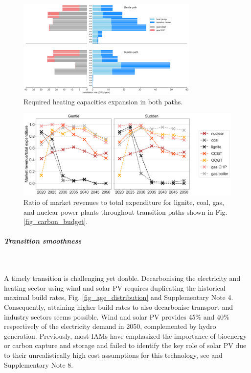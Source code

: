 \documentclass[5p]{elsarticle} %
\begin{document}
\begin{figure}[!h]
\centering
\includegraphics[width=0.8\textwidth]{figures/heating_expansion_Base.png}
\caption{Required heating capacities expansion in both paths.} \label{fig_heating_expansion} 
\end{figure}

\begin{figure}[!h]
\centering
\includegraphics[width=\columnwidth]{figures/revenue_vs_expenditure_Base.png}
\caption{Ratio of market revenues to total expenditure for lignite, coal, gas, and nuclear power plants throughout transition paths shown in Fig. \ref{fig_carbon_budget}. } \label{fig_revenue_vs_expenditure} 
\end{figure}

\subparagraph{\textbf{Transition smoothness}} \

A timely transition is challenging yet doable. Decarbonising the electricity and heating sector using wind and solar PV requires duplicating the historical \textcolor[rgb]{1,0,0}{maximal} build rates, Fig. \ref{fig_age_distribution} and Supplementary Note 4. Consequently, attaining higher build rates to also decarbonise transport and industry sectors seems possible.\textcolor[rgb]{1,0,0}{ Wind and solar PV provides 45\% and 40\% respectively of the electricity demand in 2050}, complemented by hydro generation. Previously, most IAMs have emphasized the importance of bioenergy or carbon capture and storage and failed to identify the key role of solar PV due to their unrealistically high cost assumptions for this technology, see \cite{Creutzig_2017, Krey_2019} and Supplementary Note 8. \\
\end{document}
